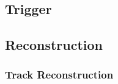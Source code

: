 \subsection{Trigger}
\subsubsection{\lone}
\subsubsection{\hltone}
\subsubsection{\hlttwo}

\subsection{Reconstruction}
\subsubsection{Track Reconstruction}


